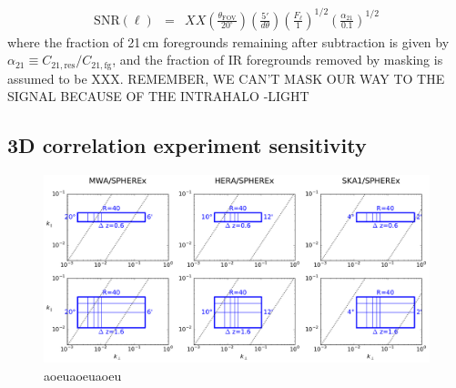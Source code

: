 \documentclass{emulateapj}
\newcommand{\IR}{\text{IR}}
\newcommand{\cosmo}{\text{cosmo}}
\newcommand{\fg}{\text{fg}}
\newcommand{\res}{\text{res}}
\newcommand{\SNR}{\text{SNR}}
\begin{document}

\begin{eqnarray}
	\SNR(\ell)&=&XX \left(\frac{\theta_\text{FOV}}{20^\circ}\right)\left(\frac{5'}{d\theta}\right)\left(\frac{F_\ell}{1}\right)^{1/2}\left(\frac{\alpha_{21}}{0.1}\right)^{1/2}
\end{eqnarray}
where the fraction of 21\,cm foregrounds remaining after subtraction is given by $\alpha_{21}\equiv C_{21,\res}/C_{21,\fg}$, and the fraction of IR foregrounds removed by masking is assumed to be XXX. REMEMBER, WE CAN'T MASK OUR WAY TO THE SIGNAL BECAUSE OF THE INTRAHALO
-LIGHT


\subsection{3D correlation experiment sensitivity}

\begin{figure}[h]
\centering
\includegraphics[width=6.5in]{images/kspace_overlap.pdf}
\caption{aoeuaoeuaoeu}
\label{fig:corgrid}
\end{figure}
\end{document}
